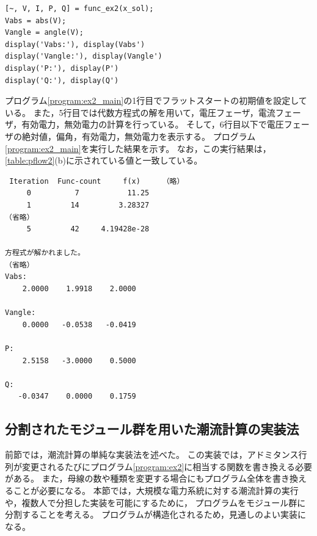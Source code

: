 \documentclass[tombow,dvipdfmx]{corona-a5-1.1}
\begin{document}
\begin{例}[潮流計算の実装法]
\begin{PROGRAMA}[count,title={main\_ex2.m}]
\begin{verbatim}
[~, V, I, P, Q] = func_ex2(x_sol);
Vabs = abs(V);
Vangle = angle(V);
display('Vabs:'), display(Vabs')
display('Vangle:'), display(Vangle')
display('P:'), display(P')
display('Q:'), display(Q')
\end{verbatim}
\end{PROGRAMA}

プログラム\nobreak\ref{program:ex2_main}の1行目でフラットスタートの初期値を設定している。
また，5行目では代数方程式の解を用いて，電圧フェーザ，電流フェーザ，有効電力，無効電力の計算を行っている。
そして，6行目以下で電圧フェーザの絶対値，偏角，有効電力，無効電力を表示する。
プログラム\nobreak\ref{program:ex2_main}を実行した結果を示す。
なお，この実行結果は，\ref{table:pflow2}(b)に示されている値と一致している。

\smallskip
\begin{実行結果}
\begin{verbatim}
 Iteration  Func-count     f(x)     （略）
     0          7           11.25 
     1         14         3.28327 
（省略）
     5         42     4.19428e-28

方程式が解かれました。
（省略）
Vabs:
    2.0000    1.9918    2.0000

Vangle:
    0.0000   -0.0538   -0.0419

P:
    2.5158   -3.0000    0.5000

Q:
   -0.0347    0.0000    0.1759
\end{verbatim}
\end{実行結果}

\end{例}

\subsection{分割されたモジュール群を用いた潮流計算の実装法}

前節では，潮流計算の単純な実装法を述べた。
この実装では，アドミタンス行列が変更されるたびにプログラム\ref{program:ex2}に相当する関数を書き換える必要がある。
また，母線の数や種類を変更する場合にもプログラム全体を書き換えることが必要になる。
本節では，大規模な電力系統に対する潮流計算の実行や，複数人で分担した実装を可能にするために，
プログラムをモジュール群に分割することを考える。
プログラムが構造化されるため，見通しのよい実装になる。
\end{document}
